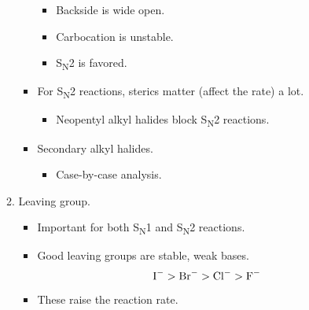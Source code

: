 \documentclass[../notes.tex]{subfiles}
\begin{document}
\begin{itemize}
\begin{enumerate}
\begin{itemize}
\begin{itemize}
                \item Backside is wide open.
                \item Carbocation is unstable.
                \item S\textsubscript{N}2 is favored.
            \end{itemize}
            \item For S\textsubscript{N}2 reactions, sterics matter (affect the rate) a lot.
            \begin{itemize}
                \item Neopentyl alkyl halides block S\textsubscript{N}2 reactions.
            \end{itemize}
            \item Secondary alkyl halides.
            \begin{itemize}
                \item Case-by-case analysis.
            \end{itemize}
        \end{itemize}
        \item Leaving group.
        \begin{itemize}
            \item Important for both S\textsubscript{N}1 and S\textsubscript{N}2 reactions.
            \item Good leaving groups are stable, weak bases.
            \begin{equation*}
                \ce{I-} > \ce{Br-} > \ce{Cl-} > \ce{F-}
            \end{equation*}
            \item These raise the reaction rate.
        \end{itemize}
    \end{enumerate}
\end{itemize}
\end{document}
